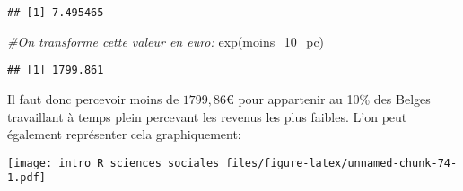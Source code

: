 \documentclass[
]{book}
\newenvironment{Shaded}{\begin{snugshade}}{\end{snugshade}}
\newcommand{\AttributeTok}[1]{\textcolor[rgb]{0.77,0.63,0.00}{#1}}
\newcommand{\CommentTok}[1]{\textcolor[rgb]{0.56,0.35,0.01}{\textit{#1}}}
\newcommand{\ConstantTok}[1]{\textcolor[rgb]{0.00,0.00,0.00}{#1}}
\newcommand{\DecValTok}[1]{\textcolor[rgb]{0.00,0.00,0.81}{#1}}
\newcommand{\FloatTok}[1]{\textcolor[rgb]{0.00,0.00,0.81}{#1}}
\newcommand{\FunctionTok}[1]{\textcolor[rgb]{0.00,0.00,0.00}{#1}}
\newcommand{\NormalTok}[1]{#1}
\newcommand{\OtherTok}[1]{\textcolor[rgb]{0.56,0.35,0.01}{#1}}
\newcommand{\SpecialCharTok}[1]{\textcolor[rgb]{0.00,0.00,0.00}{#1}}
\newcommand{\StringTok}[1]{\textcolor[rgb]{0.31,0.60,0.02}{#1}}
\begin{document}
\begin{verbatim}
## [1] 7.495465
\end{verbatim}

\begin{Shaded}
\begin{Highlighting}[]
\CommentTok{\#On transforme cette valeur en euro:}
\FunctionTok{exp}\NormalTok{(moins\_10\_pc)}
\end{Highlighting}
\end{Shaded}

\begin{verbatim}
## [1] 1799.861
\end{verbatim}

Il faut donc percevoir moins de \(1799,86€\) pour appartenir au 10\% des Belges travaillant à temps plein percevant les revenus les plus faibles. L'on peut également représenter cela graphiquement:

\begin{Shaded}
\end{Shaded}

\texttt{[image: intro\_R\_sciences\_sociales\_files/figure-latex/unnamed-chunk-74-1.pdf]}
\end{document}

